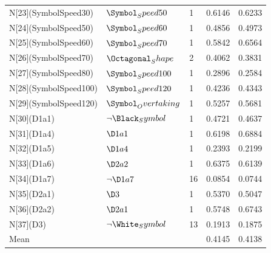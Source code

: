 \begin{tabular}{lllll}
N[23](SymbolSpeed30) & $\Symbol_Speed50$ & 1 & 0.6146 & 0.6233 \\
N[24](SymbolSpeed50) & $\Symbol_Speed60$ & 1 & 0.4856 & 0.4973 \\
N[25](SymbolSpeed60) & $\Symbol_Speed70$ & 1 & 0.5842 & 0.6564 \\
N[26](SymbolSpeed70) & $\Octagonal_Shape$ & 2 & 0.4062 & 0.3831 \\
N[27](SymbolSpeed80) & $\Symbol_Speed100$ & 1 & 0.2896 & 0.2584 \\
N[28](SymbolSpeed100) & $\Symbol_Speed120$ & 1 & 0.4236 & 0.4343 \\
N[29](SymbolSpeed120) & $\Symbol_Overtaking$ & 1 & 0.5257 & 0.5681 \\
N[30](D1a1) & $\neg \Black_Symbol$ & 1 & 0.4721 & 0.4637 \\
N[31](D1a4) & $\D1a1$ & 1 & 0.6198 & 0.6884 \\
N[32](D1a5) & $\D1a4$ & 1 & 0.2393 & 0.2199 \\
N[33](D1a6) & $\D2a2$ & 1 & 0.6375 & 0.6139 \\
N[34](D1a7) & $\neg \D1a7$ & 16 & 0.0854 & 0.0744 \\
N[35](D2a1) & $\D3$ & 1 & 0.5370 & 0.5047 \\
N[36](D2a2) & $\D2a1$ & 1 & 0.5748 & 0.6743 \\
N[37](D3) & $\neg \White_Symbol$ & 13 & 0.1913 & 0.1875 \\
Mean &  &  & 0.4145 & 0.4138 \\
\bottomrule
\end{tabular}
